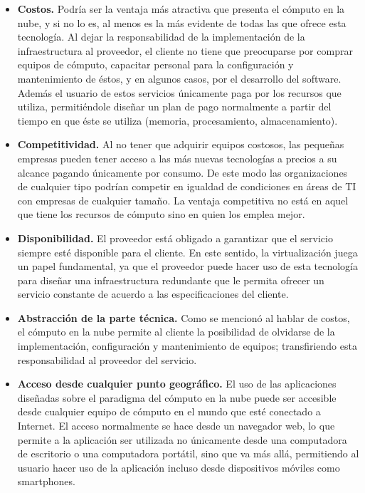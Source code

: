 \begin{itemize}
	\item \textbf{Costos.} Podría ser la ventaja más atractiva que presenta el cómputo en la nube, y si no lo es, al menos es la más evidente de todas las que ofrece esta tecnología. Al dejar la responsabilidad de la implementación de la infraestructura al proveedor, el cliente no tiene que preocuparse por comprar equipos de cómputo, capacitar personal para la configuración y mantenimiento de éstos, y en algunos casos, por el desarrollo del software. Además el usuario de estos servicios únicamente paga por los recursos que utiliza, permitiéndole diseñar un plan de pago normalmente a partir del tiempo en que éste se utiliza (memoria, procesamiento, almacenamiento).
	
	\item \textbf{Competitividad.} Al no tener que adquirir equipos costosos, las pequeñas empresas pueden tener acceso a las más nuevas tecnologías a precios a su alcance pagando únicamente por consumo. De este modo las organizaciones de cualquier tipo podrían competir en igualdad de condiciones en áreas de TI con empresas de cualquier tamaño. La ventaja competitiva no está en aquel que tiene los recursos de cómputo sino en quien los emplea mejor.
	
	\item \textbf{Disponibilidad.} El proveedor está obligado a garantizar que el servicio siempre esté disponible para el cliente. En este sentido, la virtualización juega un papel fundamental, ya que el proveedor puede hacer uso de esta tecnología para diseñar una infraestructura redundante que le permita ofrecer un servicio constante de acuerdo a las especificaciones del cliente.


	\item \textbf{Abstracción de la parte técnica.} Como se mencionó al hablar de costos, el cómputo en la nube permite al cliente la posibilidad de olvidarse de la implementación, configuración y mantenimiento de equipos; transfiriendo esta responsabilidad al proveedor del servicio.

	\item \textbf{Acceso desde cualquier punto geográfico.} El uso de las aplicaciones diseñadas sobre el paradigma del cómputo en la nube puede ser accesible desde cualquier equipo de cómputo en el mundo que esté conectado a Internet. El acceso normalmente se hace desde un navegador web, lo que permite a la aplicación ser utilizada no únicamente desde una computadora de escritorio o una computadora portátil, sino que va más allá, permitiendo al usuario hacer uso de la aplicación incluso desde dispositivos móviles como smartphones.
	

\end{itemize}
